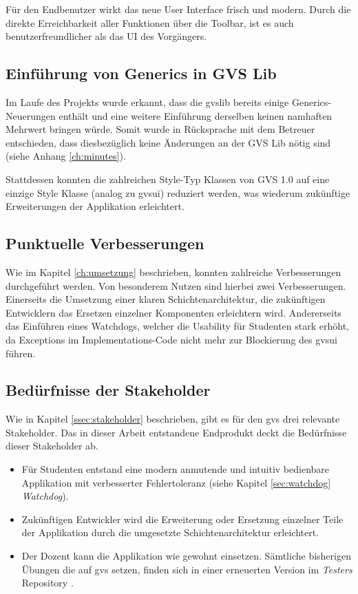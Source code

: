 \documentclass[11pt,a4paper,english,oneside]{book}
\numberwithin{equation}{chapter}
\begin{document}
	Für den Endbenutzer wirkt das neue User Interface frisch und modern. Durch die direkte Erreichbarkeit aller Funktionen über die Toolbar, ist es auch benutzerfreundlicher als das UI des Vorgängers.
	
	\subsection{Einführung von Generics in GVS Lib}
	Im Laufe des Projekts wurde erkannt, dass die \gls{gvslib} bereits einige Generics-Neuerungen enthält und eine weitere Einführung derselben keinen namhaften Mehrwert bringen würde. Somit wurde in Rücksprache mit dem Betreuer entschieden, dass diesbezüglich keine Änderungen an der GVS Lib nötig sind (siehe Anhang \ref{ch:minutes}).
	
	Stattdessen konnten die zahlreichen Style-Typ Klassen von GVS 1.0 auf eine einzige Style Klasse (analog zu \gls{gvsui}) reduziert werden, was wiederum zukünftige Erweiterungen der Applikation erleichtert.
	
	\subsection{Punktuelle Verbesserungen}
	Wie im Kapitel \ref{ch:umsetzung} beschrieben, konnten zahlreiche Verbesserungen durchgeführt werden. Von besonderem Nutzen sind hierbei zwei Verbesserungen. Einerseits die Umsetzung einer klaren Schichtenarchitektur, die zukünftigen Entwicklern das Ersetzen einzelner Komponenten erleichtern wird. Andererseits das Einführen eines Watchdogs, welcher die Usability für Studenten stark erhöht, da Exceptions im Implementations-Code nicht mehr zur Blockierung des \gls{gvsui} führen.
	
	\subsection{Bedürfnisse der Stakeholder}
	Wie in Kapitel \ref{ssec:stakeholder} beschrieben, gibt es für den \gls{gvs} drei relevante Stakeholder. Das in dieser Arbeit entstandene Endprodukt deckt die Bedürfnisse dieser Stakeholder ab.
	
	\begin{itemize}
		\item Für Studenten entstand eine modern anmutende und intuitiv bedienbare Applikation mit verbesserter Fehlertoleranz (siehe Kapitel \ref{sec:watchdog} \textit{Watchdog}).
		\item Zukünftigen Entwickler wird die Erweiterung oder Ersetzung einzelner Teile der Applikation durch die umgesetzte Schichtenarchitektur erleichtert.
		\item Der Dozent kann die Applikation wie gewohnt einsetzen. Sämtliche bisherigen Übungen die auf \gls{gvs} setzen, finden sich in einer erneuerten Version im \textit{Testers} Repository \cite{gvs-tester}.
	\end{itemize}
	
\end{document}

